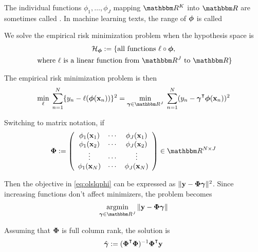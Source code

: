 \begin{frame}

    \vspace{2em}
    The individual functions $\phi_1, \ldots, \phi_J$ mapping
    $\RR^K$ into $\RR$ are sometimes called .
    In machine learning texts, the range of ${\boldsymbol \phi}$ is called 
    
    \vspace{.7em}
    We solve the
    empirical risk minimization problem when 
    the hypothesis space is
    \begin{multline*}
        \hH_{\boldphi} := \{ \text{all functions } \ell \circ \boldphi,  
        \\ \text{ where $\ell$  is a linear function from $\RR^J$ to $\RR$} \}
    \end{multline*}
    
    The empirical risk minimization problem is then
    \begin{equation}
        \label{eq:olslqphi}
            \min_{\ell } \;
            \sum_{n=1}^N \{ y_n - \ell(\boldphi(\boldx_n)) \}^2
            =
            \min_{\boldgamma \in \RR^J} \;
            \sum_{n=1}^N (y_n - \boldgamma^\T \boldphi(\boldx_n))^2
    \end{equation}
    
\end{frame}

\begin{frame}

    \vspace{2em}
    Switching to matrix notation, if
    \begin{equation}
        \label{eq:phidesign}
        \boldPhi := 
        \left(
        \begin{array}{ccc}
            \phi_1(\boldx_1) & \cdots & \phi_J(\boldx_1)   \\
            \phi_1(\boldx_2) & \cdots & \phi_J(\boldx_2)   \\
            \vdots & \cdots & \vdots   \\
            \phi_1(\boldx_N) & \cdots & \phi_J(\boldx_N)   \\
        \end{array}
        \right) \in \RR^{N \times J}
    \end{equation}
    
    Then the objective in \eqref{eq:olslqphi} 
    can be expressed as $\| {\mathbf y} - {\boldsymbol \Phi} {\boldsymbol \gamma} \|^2$.
    Since increasing functions don't affect minimizers, the problem becomes
    \begin{equation}
        \label{eq:olsesphi}
         \argmin_{\boldgamma \in \RR^J} \| \boldy - \boldPhi \boldgamma \|
    \end{equation}
    
    Assuming that ${\boldsymbol \Phi}$ is full column rank, the solution is
    \begin{equation*}
        \hboldgamma := (\boldPhi^\T \boldPhi)^{-1} \boldPhi^\T \boldy
    \end{equation*}
    
\end{frame}

